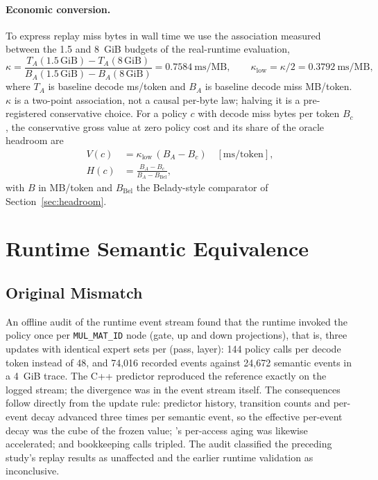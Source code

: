 \documentclass[11pt]{article}
\theoremstyle{plain}
\theoremstyle{definition}
\newcommand{\code}[1]{\texttt{\seqsplit{#1}}}
\newcommand{\klow}{\kappa_{\mathrm{low}}}
\begin{document}
\paragraph{Economic conversion.} To express replay miss bytes in wall time we use the association measured between the 1.5 and 8~GiB budgets of the real-runtime evaluation,
\begin{equation}
\kappa = \frac{T_A(1.5\,\mathrm{GiB}) - T_A(8\,\mathrm{GiB})}{B_A(1.5\,\mathrm{GiB}) - B_A(8\,\mathrm{GiB})} = 0.7584~\mathrm{ms/MB},\qquad \klow = \kappa/2 = 0.3792~\mathrm{ms/MB},
\label{eq:kappa}
\end{equation}
where $T_A$ is baseline decode ms/token and $B_A$ is baseline decode miss MB/token. $\kappa$ is a two-point association, not a causal per-byte law; halving it is a pre-registered conservative choice. For a policy $c$ with decode miss bytes per token $B_c$, the conservative gross value at zero policy cost and its share of the oracle headroom are
\begin{align}
V(c) &= \klow\,(B_A - B_c) \quad [\mathrm{ms/token}], \label{eq:value}\\
H(c) &= \frac{B_A - B_c}{B_A - B_{\mathrm{Bel}}}, \label{eq:capture}
\end{align}
with $B$ in MB/token and $B_{\mathrm{Bel}}$ the Belady-style comparator of Section~\ref{sec:headroom}.

\section{Runtime Semantic Equivalence}
\label{sec:semantics}

\subsection{Original Mismatch}
An offline audit of the runtime event stream found that the runtime invoked the policy once per \texttt{MUL\_MAT\_ID} node (gate, up and down projections), that is, three updates with identical expert sets per (pass, layer): 144 policy calls per decode token instead of 48, and 74{,}016 recorded events against 24{,}672 semantic events in a 4~GiB trace. The C++ predictor reproduced the reference exactly on the logged stream; the divergence was in the event stream itself. The consequences follow directly from the update rule: predictor history, transition counts and per-event decay advanced three times per semantic event, so the effective per-event decay was the cube of the frozen value; \code{b\_selected}'s per-access aging was likewise accelerated; and bookkeeping calls tripled. The audit classified the preceding study's replay results as unaffected and the earlier runtime validation as inconclusive.
\end{document}
